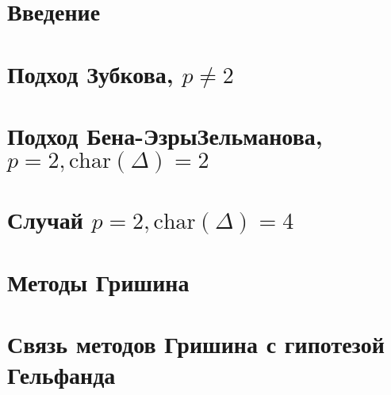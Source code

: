 \documentclass[12pt,a4paper]{article}
\renewcommand{\char}{\ensuremath{\mathrm{char}}}
\begin{document}
    


    \begin{abstract}
        
    \end{abstract}
    \tableofcontents


    \section{Введение}\label{sec:introduction}
    


    \section{Подход Зубкова, $p\neq2$}\label{sec:Zubkov}
    


    \section{Подход Бена-Эзры\textemdash Зельманова, $p = 2, \char(\Delta) = 2$}\label{sec:Ben-Ezra-Zelmanov}
    


    \section{Случай $p=2, \char(\Delta) = 4$}\label{sec:char-4}
    


    \section{Методы Гришина}\label{sec:Grichin}
    


    \section{Связь методов Гришина с гипотезой Гельфанда}\label{sec:Gelfand}
    

    \printbibliography
\end{document}
